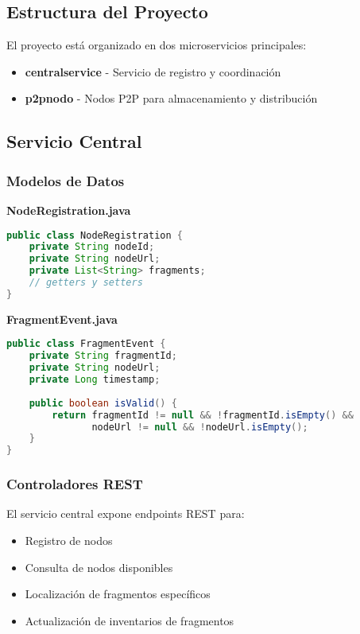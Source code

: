 \subsection*{Estructura del Proyecto}

El proyecto está organizado en dos microservicios principales:

\begin{itemize}
    \item \textbf{centralservice} - Servicio de registro y coordinación
    \item \textbf{p2pnodo} - Nodos P2P para almacenamiento y distribución
\end{itemize}
\newpage
\subsection*{Servicio Central}

\subsubsection*{Modelos de Datos}

\textbf{NodeRegistration.java}
\begin{lstlisting}[language=Java]
public class NodeRegistration {
    private String nodeId;
    private String nodeUrl;
    private List<String> fragments;
    // getters y setters
}
\end{lstlisting}

\textbf{FragmentEvent.java}
\begin{lstlisting}[language=Java]
public class FragmentEvent {
    private String fragmentId;
    private String nodeUrl;
    private Long timestamp;
    
    public boolean isValid() {
        return fragmentId != null && !fragmentId.isEmpty() &&
               nodeUrl != null && !nodeUrl.isEmpty();
    }
}
\end{lstlisting}

\subsubsection*{Controladores REST}

El servicio central expone endpoints REST para:
\begin{itemize}
    \item Registro de nodos
    \item Consulta de nodos disponibles
    \item Localización de fragmentos específicos
    \item Actualización de inventarios de fragmentos
\end{itemize}


